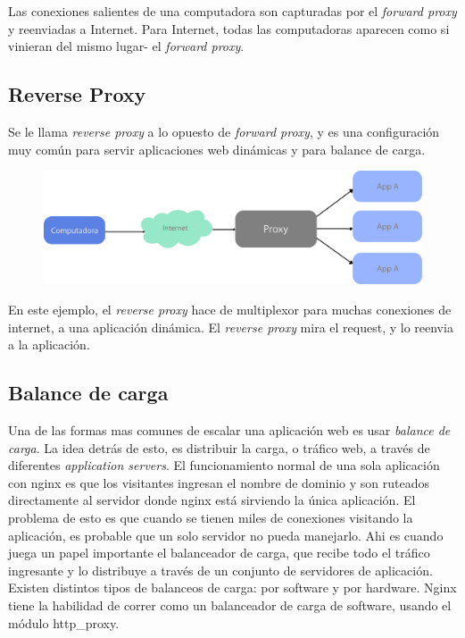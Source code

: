 Las conexiones salientes de una computadora son capturadas por el \textit{forward proxy} y reenviadas a Internet. Para Internet, todas las computadoras aparecen como si vinieran del mismo lugar- el \textit{forward proxy}.


\subsection[Reverse Proxy]{Reverse Proxy}

Se le llama \textit{reverse proxy} a lo opuesto de \textit{forward proxy}, y es una configuración muy común para servir aplicaciones web dinámicas y para balance de carga.

\begin{figure}[h!]
  \centering
    \includegraphics[scale=0.7]{images/reverse-proxy.png}
  \label{fig:reverseproxy}
\end{figure}

En este ejemplo, el \textit{reverse proxy} hace de multiplexor para muchas conexiones de internet, a una aplicación dinámica. El \textit{reverse proxy} mira el request, y lo reenvia a la aplicación.

\subsection[Balance de carga]{Balance de carga}

Una de las formas mas comunes de escalar una aplicación web es usar \textit{balance de carga}. La idea detrás de esto, es distribuir la carga, o tráfico web, a través de diferentes \textit{application servers}.
El funcionamiento normal de una sola aplicación con nginx es que los visitantes ingresan el nombre de dominio y son ruteados directamente al servidor donde nginx está sirviendo la única aplicación. El problema de esto es que cuando se tienen miles de conexiones visitando la aplicación, es probable que un solo servidor no pueda manejarlo. 
Ahi es cuando juega un papel importante el balanceador de carga, que recibe todo el tráfico ingresante y lo distribuye a través de un conjunto de servidores de aplicación.
Existen distintos tipos de balanceos de carga: por software y por hardware. Nginx tiene la habilidad de correr como un balanceador de carga de software, usando el módulo http\_proxy.

